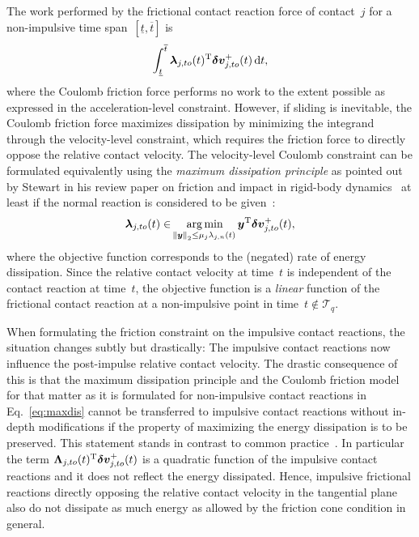 \documentclass[global,twocolumn]{svjour}
\let\vec\bm
\newcommand{\argmin}{\operatornamewithlimits{arg\,min}}
\newcommand{\vectoscalar}[1]{{\renewcommand{\vec}{}#1}}
\newcommand{\intervalCC}[2]{\ensuremath{\left[ #1, #2 \right]}}
\newcommand{\transp}{{\mathrm{T}}}
\newcommand{\cof}[1]{\ensuremath{\mu_{#1}}}
\newcommand{\contactforce}[1]{\ensuremath{\vec{\lambda}_{#1}}}
\newcommand{\contactforceCFn}[1]{\ensuremath{\vectoscalar{\contactforce{\ifstrequal{#1}{}{n}{#1,n}}}}}
\newcommand{\contactforceCFto}[1]{\ensuremath{\contactforce{\ifstrequal{#1}{}{to}{#1,to}}}}
\newcommand{\contactimpulse}[1]{\ensuremath{\vec{\Lambda}_{#1}}}
\newcommand{\contactimpulseCFto}[1]{\ensuremath{\contactimpulse{\ifstrequal{#1}{}{to}{#1,to}}}}
\newcommand{\postrelvel}[1]{\ensuremath{{\vec{\delta v}_{#1}^+}}}
\newcommand{\postrelvelCFto}[1]{\ensuremath{\postrelvel{\ifstrequal{#1}{}{to}{#1,to}}}}
\newcommand*\diff{\mathop{}\!\mathrm{d}}
\begin{document}
		The work performed by the frictional contact reaction force of
		contact~$j$ for a non-impulsive time
		span~\intervalCC{\underline{t}}{\overline{t}} is
		\begin{equation*}
			\int_{\underline{t}}^{\overline{t}} \contactforceCFto{j}(t)^\transp \postrelvelCFto{j}(t) \diff t,
		\end{equation*}
		where the Coulomb friction force performs no work to the extent possible
		as expressed in the acceleration-level constraint. However, if sliding is
		inevitable, the Coulomb friction force maximizes dissipation by
		minimizing the integrand through the velocity-level constraint, which
		requires the friction force to directly oppose the relative contact
		velocity. The velocity-level Coulomb constraint can be formulated
		equivalently using the \emph{maximum dissipation principle} as pointed
		out by Stewart in his review paper on friction and impact in rigid-body
		dynamics~\cite{stewart00} at least if the normal reaction is considered
		to be given~\cite{stewart11}:
		\begin{equation}
			\contactforceCFto{j}(t) \in \argmin_{\norm{\vec y}_2 \leq \cof{j} \contactforceCFn{j}(t)} \vec y^\transp \postrelvelCFto{j}(t),
			\label{eq:maxdis}
		\end{equation}
		where the objective function corresponds to the (negated) rate of energy
		dissipation. Since the relative contact velocity at time~$t$ is
		independent of the contact reaction at time~$t$, the objective function
		is a \emph{linear} function of the frictional contact reaction at a
		non-impulsive point in time~$t \not \in \mathcal{T}_q$.

		When formulating the friction constraint on the impulsive contact
		reactions, the situation changes subtly but drastically: The impulsive
		contact reactions now influence the post-impulse relative contact
		velocity. The drastic consequence of this is that the maximum
		dissipation principle and the Coulomb friction model for that matter
		as it is formulated for non-impulsive contact reactions in
		Eq.~\eqref{eq:maxdis} cannot be transferred to impulsive contact
		reactions without in-depth modifications if the property of maximizing the
		energy dissipation is to be preserved. This statement stands in
		contrast to common practice~\cite{jean99, stewart00, bonnefon11}.
		In particular the
		term $\contactimpulseCFto{j}(t)^\transp \postrelvelCFto{j}(t)$ is a
		quadratic function of the impulsive contact reactions and it does not
		reflect the energy dissipated. Hence, impulsive frictional reactions
		directly opposing the relative contact velocity in the tangential plane
		also do not dissipate as much energy as allowed by the friction cone
		condition in general.
\end{document}
